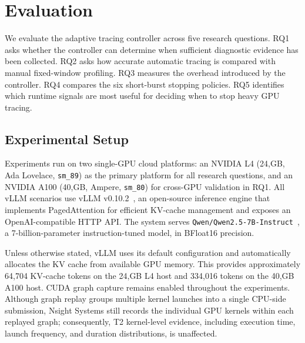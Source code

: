 \section{Evaluation}

We evaluate the adaptive tracing controller across five research questions. RQ1 asks whether the controller can determine when sufficient diagnostic evidence has been collected. RQ2 asks how accurate automatic tracing is compared with manual fixed-window profiling. RQ3 measures the overhead introduced by the controller. RQ4 compares the six short-burst stopping policies. RQ5 identifies which runtime signals are most useful for deciding when to stop heavy GPU tracing.




\subsection{Experimental Setup}

Experiments run on two single-GPU cloud platforms: an NVIDIA L4 (24,GB, Ada Lovelace, \texttt{sm\_89}) as the primary platform for all research questions, and an NVIDIA A100 (40,GB, Ampere, \texttt{sm\_80}) for cross-GPU validation in RQ1. All vLLM scenarios use vLLM v0.10.2~\cite{kwon2023vllm}, an open-source inference engine that implements PagedAttention for efficient KV-cache management and exposes an OpenAI-compatible HTTP API. The system serves \texttt{Qwen/Qwen2.5-7B-Instruct}~\cite{qwen2025}, a 7-billion-parameter instruction-tuned model, in BFloat16 precision.

Unless otherwise stated, vLLM uses its default configuration and automatically allocates the KV cache from available GPU memory. This provides approximately 64,704 KV-cache tokens on the 24,GB L4 host and 334,016 tokens on the 40,GB A100 host. CUDA graph capture remains enabled throughout the experiments. Although graph replay groups multiple kernel launches into a single CPU-side submission, Nsight Systems still records the individual GPU kernels within each replayed graph; consequently, T2 kernel-level evidence, including execution time, launch frequency, and duration distributions, is unaffected.

